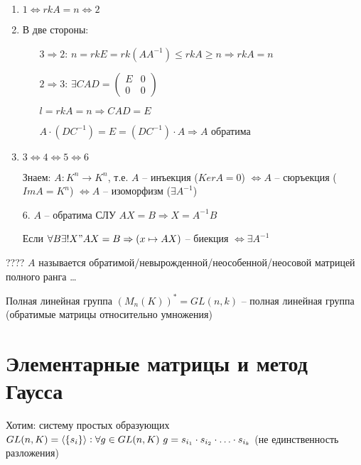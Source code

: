 \documentclass[12pt]{article}
\begin{document}
\begin{enumerate}
    \item $1 \Leftrightarrow rkA = n \Leftrightarrow 2$
    \item В две стороны:
    
    \begin{itemize}
        \item[$3 \Rightarrow 2$:] $n = rkE = rk(AA^{-1}) \leq rkA \geq n \Rightarrow rkA = n$
        \item[$2 \Rightarrow 3$:] $\exists CAD = \begin{pmatrix}
            E & 0 \\
            0 & 0
        \end{pmatrix}$

        $l = rkA = n \Rightarrow CAD = E$

        $A \cdot (DC^{-1}) = E = (DC^{-1}) \cdot A \Rightarrow A$ обратима
    \end{itemize}
    \item $3 \Leftrightarrow 4 \Leftrightarrow 5 \Leftrightarrow 6$
    
    Знаем: $A : K^n \to K^n$, т.е. $A$ -- инъекция ($KerA = 0$) $\Leftrightarrow A$ -- сюръекция ($ImA = K^n$) $\Leftrightarrow A$ -- изоморфизм ($\exists A^{-1}$) 

    \item[6.] $A$ -- обратима СЛУ $AX = B \Rightarrow X = A^{-1}B$
    
    Если $\forall B \exists! X " AX = B \Rightarrow (x \mapsto AX)$ -- биекция $\Leftrightarrow \exists A^{-1}$
\end{enumerate}

\begin{defin}{????}
    $A$ называется обратимой/невырожденной/неособенной/неосовой матрицей полного ранга \dots
\end{defin}

\begin{defin}{Полная линейная группа}
    $(M_n(K))^* = GL(n, k)$ -- полная линейная группа (обратимые матрицы относительно умножения)
\end{defin}

\section{Элементарные матрицы и метод Гаусса}

Хотим: систему простых образующих $GL(n, K) = \langle \{s_i\} \rangle : \forall g \in GL(n, K)\ g = s_{i_1} \cdot s_{i_2} \cdot \ldots \cdot s_{i_k}$ (не единственность разложения)
\end{document}
